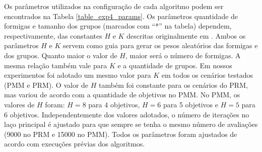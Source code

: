 Os parâmetros utilizados na configuração de cada algoritmo podem ser encontrados na Tabela \ref{table_exp4_params}. Os parâmetros quantidade de formigas e tamanho dos grupos (marcados com ``*'' na tabela) dependem, respectivamente, das constantes $H$ e $K$ descritas originalmente em \cite{Ke2013}. Ambos os parâmetros $H$ e $K$ servem como guia para gerar os pesos aleatórios das formigas e dos grupos. Quanto maior o valor de $H$, maior será o número de formigas. A mesma relação também vale para $K$ e a quantidade de grupos. Em nossos experimentos foi adotado um mesmo valor para $K$ em todos os cenários testados (PMM e PRM). O valor de $H$ também foi constante para os cenários do PRM, mas variou de acordo com a quantidade de objetivos no PMM. No PMM, os valores de $H$ foram: $H=8$ para 4 objetivos, $H=6$ para 5 objetivos e $H=5$ para 6 objetivos. Independentemente dos valores adotados, o número de iterações no laço principal é ajustado para que sempre se tenha o mesmo número de avaliações (9000 no PRM e 15000 no PMM). Todos os parâmetros foram ajustados de acordo com execuções prévias dos algoritmos. 


